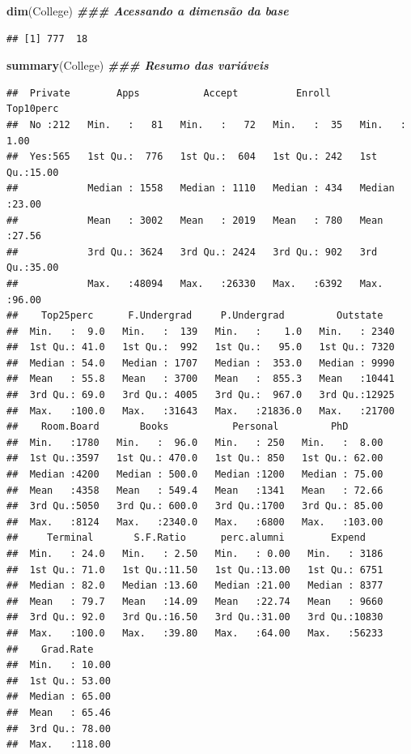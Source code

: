 \documentclass[
]{article}
\newenvironment{Shaded}{\begin{snugshade}}{\end{snugshade}}
\newcommand{\DocumentationTok}[1]{\textcolor[rgb]{0.56,0.35,0.01}{\textbf{\textit{#1}}}}
\newcommand{\FunctionTok}[1]{\textcolor[rgb]{0.13,0.29,0.53}{\textbf{#1}}}
\newcommand{\NormalTok}[1]{#1}
\begin{document}
\begin{Shaded}
\begin{Highlighting}[]
\FunctionTok{dim}\NormalTok{(College) }\DocumentationTok{\#\#\# Acessando a dimensão da base}
\end{Highlighting}
\end{Shaded}

\begin{verbatim}
## [1] 777  18
\end{verbatim}

\begin{Shaded}
\begin{Highlighting}[]
\FunctionTok{summary}\NormalTok{(College) }\DocumentationTok{\#\#\# Resumo das variáveis}
\end{Highlighting}
\end{Shaded}

\begin{verbatim}
##  Private        Apps           Accept          Enroll       Top10perc    
##  No :212   Min.   :   81   Min.   :   72   Min.   :  35   Min.   : 1.00  
##  Yes:565   1st Qu.:  776   1st Qu.:  604   1st Qu.: 242   1st Qu.:15.00  
##            Median : 1558   Median : 1110   Median : 434   Median :23.00  
##            Mean   : 3002   Mean   : 2019   Mean   : 780   Mean   :27.56  
##            3rd Qu.: 3624   3rd Qu.: 2424   3rd Qu.: 902   3rd Qu.:35.00  
##            Max.   :48094   Max.   :26330   Max.   :6392   Max.   :96.00  
##    Top25perc      F.Undergrad     P.Undergrad         Outstate    
##  Min.   :  9.0   Min.   :  139   Min.   :    1.0   Min.   : 2340  
##  1st Qu.: 41.0   1st Qu.:  992   1st Qu.:   95.0   1st Qu.: 7320  
##  Median : 54.0   Median : 1707   Median :  353.0   Median : 9990  
##  Mean   : 55.8   Mean   : 3700   Mean   :  855.3   Mean   :10441  
##  3rd Qu.: 69.0   3rd Qu.: 4005   3rd Qu.:  967.0   3rd Qu.:12925  
##  Max.   :100.0   Max.   :31643   Max.   :21836.0   Max.   :21700  
##    Room.Board       Books           Personal         PhD        
##  Min.   :1780   Min.   :  96.0   Min.   : 250   Min.   :  8.00  
##  1st Qu.:3597   1st Qu.: 470.0   1st Qu.: 850   1st Qu.: 62.00  
##  Median :4200   Median : 500.0   Median :1200   Median : 75.00  
##  Mean   :4358   Mean   : 549.4   Mean   :1341   Mean   : 72.66  
##  3rd Qu.:5050   3rd Qu.: 600.0   3rd Qu.:1700   3rd Qu.: 85.00  
##  Max.   :8124   Max.   :2340.0   Max.   :6800   Max.   :103.00  
##     Terminal       S.F.Ratio      perc.alumni        Expend     
##  Min.   : 24.0   Min.   : 2.50   Min.   : 0.00   Min.   : 3186  
##  1st Qu.: 71.0   1st Qu.:11.50   1st Qu.:13.00   1st Qu.: 6751  
##  Median : 82.0   Median :13.60   Median :21.00   Median : 8377  
##  Mean   : 79.7   Mean   :14.09   Mean   :22.74   Mean   : 9660  
##  3rd Qu.: 92.0   3rd Qu.:16.50   3rd Qu.:31.00   3rd Qu.:10830  
##  Max.   :100.0   Max.   :39.80   Max.   :64.00   Max.   :56233  
##    Grad.Rate     
##  Min.   : 10.00  
##  1st Qu.: 53.00  
##  Median : 65.00  
##  Mean   : 65.46  
##  3rd Qu.: 78.00  
##  Max.   :118.00
\end{verbatim}
\end{document}
